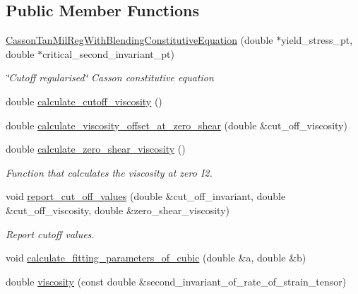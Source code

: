 \subsection*{Public Member Functions}
\begin{DoxyCompactItemize}
\item 
\hyperlink{classoomph_1_1CassonTanMilRegWithBlendingConstitutiveEquation_a69a6c3d00d715d3793d30d588fa64227}{Casson\+Tan\+Mil\+Reg\+With\+Blending\+Constitutive\+Equation} (double $\ast$yield\+\_\+stress\+\_\+pt, double $\ast$critical\+\_\+second\+\_\+invariant\+\_\+pt)
\begin{DoxyCompactList}\small\item\em \char`\"{}\+Cutoff regularised\char`\"{} Casson constitutive equation \end{DoxyCompactList}\item 
double \hyperlink{classoomph_1_1CassonTanMilRegWithBlendingConstitutiveEquation_a5fcaff96bfabae7666c4f7a91699df5b}{calculate\+\_\+cutoff\+\_\+viscosity} ()
\item 
double \hyperlink{classoomph_1_1CassonTanMilRegWithBlendingConstitutiveEquation_af844c87f95a40d6c503bbaee6292482b}{calculate\+\_\+viscosity\+\_\+offset\+\_\+at\+\_\+zero\+\_\+shear} (double \&cut\+\_\+off\+\_\+viscosity)
\item 
double \hyperlink{classoomph_1_1CassonTanMilRegWithBlendingConstitutiveEquation_acbab1c4047d193a4d6136856dbd599d0}{calculate\+\_\+zero\+\_\+shear\+\_\+viscosity} ()
\begin{DoxyCompactList}\small\item\em Function that calculates the viscosity at zero I2. \end{DoxyCompactList}\item 
void \hyperlink{classoomph_1_1CassonTanMilRegWithBlendingConstitutiveEquation_a85c8fceda5fda7218847f277c3a2920e}{report\+\_\+cut\+\_\+off\+\_\+values} (double \&cut\+\_\+off\+\_\+invariant, double \&cut\+\_\+off\+\_\+viscosity, double \&zero\+\_\+shear\+\_\+viscosity)
\begin{DoxyCompactList}\small\item\em Report cutoff values. \end{DoxyCompactList}\item 
void \hyperlink{classoomph_1_1CassonTanMilRegWithBlendingConstitutiveEquation_a95e4e6c016eb2942765f1ed4b1f4d0de}{calculate\+\_\+fitting\+\_\+parameters\+\_\+of\+\_\+cubic} (double \&a, double \&b)
\item 
double \hyperlink{classoomph_1_1CassonTanMilRegWithBlendingConstitutiveEquation_a6794675f3a7e2def339b01a5f9a71447}{viscosity} (const double \&second\+\_\+invariant\+\_\+of\+\_\+rate\+\_\+of\+\_\+strain\+\_\+tensor)

\end{DoxyCompactItemize}
